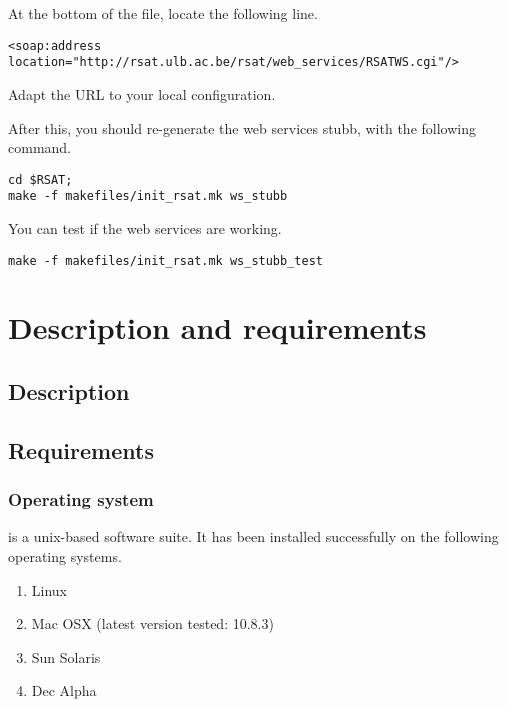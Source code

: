 \documentclass[12pt,a4paper, oneside]{scrreprt} %
\begin{document}
At the bottom of the file, locate the following line.

\begin{footnotesize}
\begin{verbatim}
<soap:address location="http://rsat.ulb.ac.be/rsat/web_services/RSATWS.cgi"/>
\end{verbatim}
\end{footnotesize}

Adapt the URL to your local configuration.

After this, you should re-generate the web services stubb, with the
following command.

  \begin{lstlisting}
cd $RSAT; 
make -f makefiles/init_rsat.mk ws_stubb
  \end{lstlisting}

You can test if the web services are working.

  \begin{lstlisting}
make -f makefiles/init_rsat.mk ws_stubb_test
  \end{lstlisting}

\chapter{Description and requirements}

\section{Description}


\section{Requirements}

\subsection{Operating system}

\RSAT is a unix-based software suite. It has been installed
successfully on the following operating systems.

\begin{enumerate}
\item Linux

\item Mac OSX (latest version tested: 10.8.3)

\item Sun Solaris

\item Dec Alpha

\end{enumerate}
\end{document}
